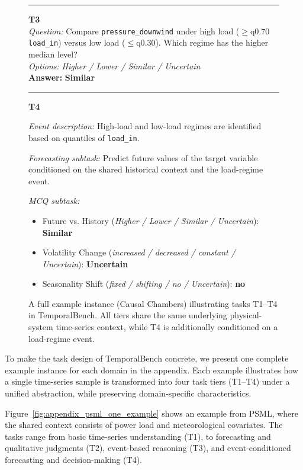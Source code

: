 \begin{figure}[htbp]
\begin{tcolorbox}[
  colback=gray!6,
  colframe=black!20,
  boxrule=0.5pt,
  arc=3pt,
  left=6pt,right=6pt,top=6pt,bottom=6pt
]
\vspace{3pt}\hrule\vspace{4pt}

\textbf{T3} \\
\emph{Question:} Compare \texttt{pressure\_downwind} under high load ($\ge$q0.70 \texttt{load\_in}) versus low load ($\le$q0.30). Which regime has the higher median level? \\
\emph{Options:} \textit{Higher / Lower / Similar / Uncertain} \\
\textbf{Answer:} \textbf{Similar}

\vspace{3pt}\hrule\vspace{4pt}

\textbf{T4}

\emph{Event description:}
High-load and low-load regimes are identified based on quantiles of \texttt{load\_in}.

\emph{Forecasting subtask:}
Predict future values of the target variable conditioned on the shared historical context and the load-regime event.

\emph{MCQ subtask:}
\begin{itemize}[leftmargin=1.1em,itemsep=0pt,topsep=0pt,parsep=0pt,partopsep=0pt]
  \item Future vs. History
  (\textit{Higher / Lower / Similar / Uncertain}): \textbf{Similar}
  \item Volatility Change
  (\textit{increased / decreased / constant / Uncertain}): \textbf{Uncertain}
  \item Seasonality Shift
  (\textit{fixed / shifting / no / Uncertain}): \textbf{no}
\end{itemize}

\end{tcolorbox}
\caption{A full example instance (Causal Chambers) illustrating tasks T1--T4 in TemporalBench. All tiers share the same underlying physical-system time-series context, while T4 is additionally conditioned on a load-regime event.}
\label{fig:appendix_causal_chambers_one_example}
\end{figure}


To make the task design of TemporalBench concrete, we present one complete example instance for each domain in the appendix. Each example illustrates how a single time-series sample is transformed into four task tiers (T1--T4) under a unified abstraction, while preserving domain-specific characteristics.

Figure~\ref{fig:appendix_psml_one_example} shows an example from PSML, where the shared context consists of power load and meteorological covariates. The tasks range from basic time-series understanding (T1), to forecasting and qualitative judgments (T2), event-based reasoning (T3), and event-conditioned forecasting and decision-making (T4).

